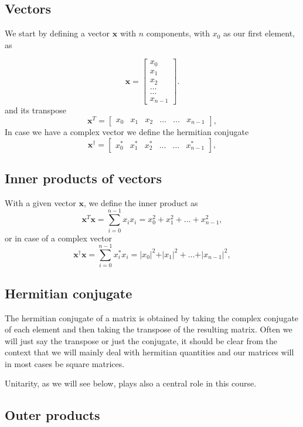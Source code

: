 \noindent
\subsection{Vectors}

We start by defining a vector $\bm{x}$  with $n$ components, with $x_0$ as our first element, as

\[
\bm{x} = \begin{bmatrix} x_0\\ x_1 \\ x_2 \\ \dots \\ \dots \\ x_{n-1} \end{bmatrix}.
\]
and its transpose 
\[
\bm{x}^{T} = \begin{bmatrix} x_0 & x_1 & x_2 & \dots & \dots & x_{n-1} \end{bmatrix},
\]
In case we have a complex vector we define the hermitian conjugate
\[
\bm{x}^{\dagger} = \begin{bmatrix} x_0^* & x_1^* & x_2^* & \dots & \dots & x_{n-1}^* \end{bmatrix},
\]

\subsection{Inner products of vectors}

With a given vector $\bm{x}$, we define the inner product as
\[
\bm{x}^T \bm{x} = \sum_{i=0}^{n-1} x_ix_i=x_0^2+x_1^2+\dots + x_{n-1}^2,
\]
or in case of a complex vector
\[
\bm{x}^{\dagger} \bm{x} = \sum_{i=0}^{n-1} x_i^*x_i=\vert x_0\vert^2+\vert x_1\vert^2+\dots + \vert x_{n-1}\vert^2,
\]

\subsection{Hermitian conjugate}

The hermitian conjugate of a matrix is obtained by taking the complex
conjugate of each element and then taking the transpose of the
resulting matrix. Often we will just say the transpose or just the
conjugate, it should be clear from the context that we will mainly
deal with hermitian quantities and our matrices will in most cases be square matrices.

Unitarity, as we will see below, plays also a central role in this course.

\subsection{Outer products}

